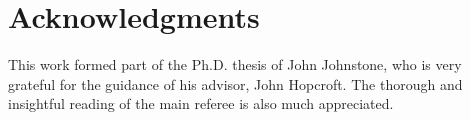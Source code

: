 
\section*{Acknowledgments}
This work formed part of the Ph.D. thesis of John Johnstone, who is very grateful for
the guidance of his advisor, John Hopcroft.
The thorough and insightful reading of the main referee is also much appreciated.
%

\nocite{baj}
\nocite{law}





